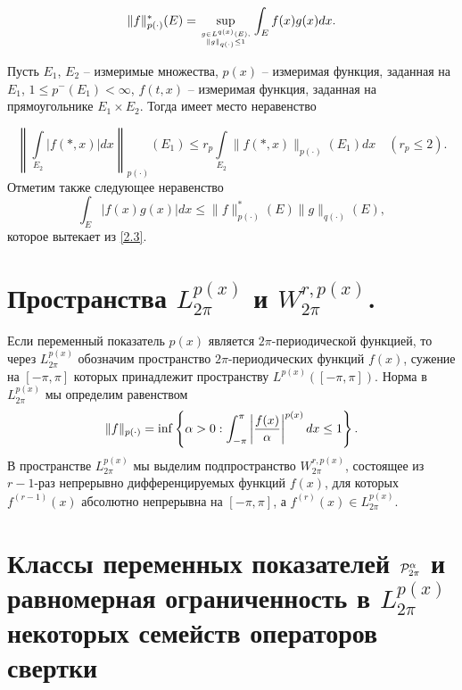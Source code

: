 \begin{equation}\label{2.3}
    \|f \|^*_{p(\cdot)}(E)=\sup_{g\in L^{q(x)}(E),\atop \|g\|_{q(\cdot)}\le1}\int_E f(x)g(x)dx.
\end{equation}

 Пусть $E_1$, $E_2$ -- измеримые множества,
$p(x)$ -- измеримая функция, заданная на $E_1$, $1\le
p^-(E_1)<\infty$, $f(t,x)$ -- измеримая функция, заданная на
прямоугольнике $E_1\times E_2$. Тогда имеет место \cite{Shar6} неравенство

\begin{equation}\label{2.4}
    \left\|\int\limits_{E_2}|f(*,x)|dx\right\|_{p(\cdot)}(E_1)\le
r_p \int\limits_{E_2}\|f(*,x)\|_{p(\cdot)}(E_1)dx\quad
(r_p\le2).
\end{equation}
Отметим также следующее неравенство
\begin{equation}\label{2.5}
    \int_E |f(x)g(x)|dx\le \|f \|^*_{p(\cdot)}(E)\|g\|_{q(\cdot)}(E),
\end{equation}
которое вытекает из \eqref{2.3}.




\section{Пространства $L_{2\pi}^{p(x)}$ и $W_{2\pi}^{r,p(x)}$.}\label{s3}

Если переменный показатель $p(x)$ является $2\pi$-периодической функцией, то через  $L_{2\pi}^{p(x)}$ обозначим пространство
$2\pi$-периодических функций $f(x)$, сужение на $[-\pi,\pi]$ которых принадлежит пространству $L^{p(x)}([-\pi,\pi])$. Норма в $L_{2\pi}^{p(x)}$ мы определим равенством
\begin{equation}\label{3.1}
    \|f\|_{p(\cdot)}=\inf \left\{\alpha>0:   \int_{-\pi}^{\pi}\left|{f(x)\over\alpha}\right|^{p(x)}dx\le1\right\}.
\end{equation}
 В пространстве $L_{2\pi}^{p(x)}$ мы выделим подпространство $W_{2\pi}^{r,p(x)}$, состоящее из \\ $r-1$-раз непрерывно дифференцируемых функций $f(x)$, для которых $f^{(r-1)}(x)$ абсолютно непрерывна на $[-\pi,\pi]$, а $f^{(r)}(x)\in L_{2\pi}^{p(x)}$.




\section{Классы переменных показателей ${\cal P}^\alpha_{2\pi}$ и равномерная ограниченность в $L_{2\pi}^{p(x)}$ некоторых семейств операторов свертки }\label{s4}

